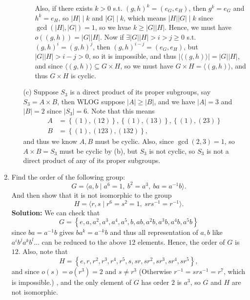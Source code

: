 \documentclass[12pt]{article}
\begin{document}
\begin{enumerate}
\begin{itemize}
\begin{itemize}
\[            \] Also, if there exists \(k > 0\) s.t. \((g, h)^k = (e_G, e_H)\), then \(g^k = e_G\) and \(h^k = e_H\), so \(\left\vert H \right\vert \mid k \) and \(\left\vert G \right\vert \mid k \), which means \(\left\vert H \right\vert \left\vert G \right\vert \mid k  \) since \(\gcd \left( \left\vert H \right\vert, \left\vert G \right\vert   \right) = 1 \), so we hvae \(k \ge \left\vert G \right\vert \left\vert H \right\vert \). Hence, we must have \(o \left( (g, h) \right) = \left\vert G \right\vert \left\vert H \right\vert   \). Now if \(\exists \left\vert G \right\vert \left\vert H \right\vert >  i > j \ge 0\) s.t. \((g, h)^i = (g, h)^j\), then \((g, h)^{i - j} = (e_G, e_H)\), but \(\left\vert G \right\vert \left\vert H \right\vert >  i - j > 0\), so it is impossible, and thus \(\left\vert \langle (g, h) \rangle  \right\vert = \left\vert G \right\vert \left\vert H \right\vert  \), and since \(\langle (g, h) \rangle \subseteq G \times H\), so we must have \(G \times H = \langle (g, h) \rangle \), and thus \(G \times H\) is cyclic.         
        \end{itemize}
        \item [(c)] Suppose \(S_3\) is a direct product of its proper subgroups, say \(S_3 = A \times B\), then WLOG suppose \(\left\vert A \right\vert \ge \left\vert B \right\vert  \), and we have \(\left\vert A \right\vert = 3 \) and \(\left\vert B \right\vert = 2\) since \(\left\vert S_3 \right\vert = 6 \). Note that this means 
        \begin{align*}
            A &= \left\{ (1), (12) \right\}, \left\{ (1), (13) \right\}, \left\{ (1), (23) \right\} \\
            B &= \left\{ (1), (123), (132) \right\}, 
        \end{align*} and thus we know \(A, B\) must be cyclic. Also, since \(\gcd(2, 3) = 1\), so \(A \times B = S_3\) must be cyclic by (b), but \(S_3\) is not cyclic, so \(S_3\) is not a direct product of any of its proper subgroups.     
    \end{itemize}
    \bigskip

    \item Find the order of the following group:
    \[
        G = \langle a, b \mid a^6 = 1, \ b^2 = a^3, \ ba = a^{-1}b \rangle.
    \]
    And then show that it is not isomorphic to the group
    \[
        H = \langle r, s \mid r^6 = s^2 = 1, \ srs^{-1} = r^{-1} \rangle.
    \]
    \textbf{Solution:} We can check that
    \[
        G = \left\{ e, a, a^2, a^3, a^4, a^5, b, ab, a^{2} b, a^3 b, a^4 b, a^5 b  \right\} 
    \]
    since \(ba = a^{-1} b\) gives \(b a^{k} = a^{-k} b\) and thus all representation of \(a, b\) like \(a^i b^j a^k b^l \dots \) can be reduced to the above \(12\) elements. Hence, the order of \(G\) is \(12\). Also, note that 
    \[
        H = \left\{ e, r, r^2, r^3, r^4, r^5, s, sr, sr^2, sr^3, sr^4, sr^5 \right\},
    \] and since \(o(s) = o\left( r^3 \right) = 2 \) and \(s \neq r^3\) (Otherwise \(r^{-1} = s r s^{-1} = r^7 \), which is impossible.) , and the only element of \(G\) has order \(2\) is \(a^3\), so \(G\) and \(H\) are not isomorphic.            


\end{enumerate}
\end{document}
